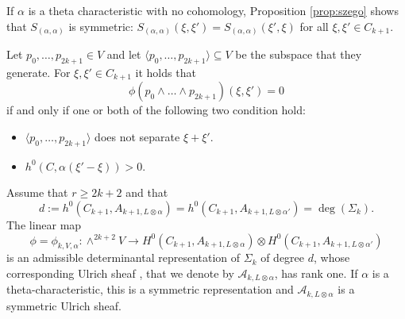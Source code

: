 \documentclass[10pt,a4paper]{amsart}
\newcommand{\sA}{\mathscr{A}}
\begin{document}
\begin{remark}\label{rem:szegosymm}
 If $\alpha$ is a theta characteristic with no cohomology, Proposition \ref{prop:szego} shows that $S_{(\alpha,\alpha)}$ is symmetric: $S_{(\alpha,\alpha)}(\xi,\xi') = S_{(\alpha,\alpha)}(\xi',\xi)$ for all $\xi,\xi'\in C_{k+1}$.
\end{remark}

\begin{lemma}\label{lem:phivanishes}
	Let $p_0,\dots,p_{2k+1} \in V$ and let $\langle p_0,\dots,p_{2k+1} \rangle \subseteq V$ be the subspace that they generate. For $\xi,\xi'\in C_{k+1}$ it holds that
	\[ \phi(p_0\wedge \dots \wedge p_{2k+1})(\xi,\xi') = 0 \]
	if and only if one or both of the following two condition hold:
	\begin{itemize}
		\item[$(a)$]  $\langle p_0,\dots,p_{2k+1} \rangle$ does not separate $\xi+\xi'$.
		\item[$(b)$] $h^0(C,\alpha(\xi'-\xi))>0$.
	\end{itemize}
\end{lemma}

\begin{theorem}\label{thm:detrep}
	Assume that $r\geq 2k+2$ and that \[d:=h^0(C_{k+1},A_{k+1,L\otimes \alpha}) = h^0(C_{k+1},A_{k+1,L\otimes \alpha'}) = \deg(\Sigma_k).\] The linear map
	\[  \phi = \phi_{k,V,\alpha} \colon \wedge^{2k+2} V \longrightarrow H^0(C_{k+1},A_{k+1,L\otimes \alpha}) \otimes H^0(C_{k+1},A_{k+1,L\otimes \alpha'}) \]
	is an admissible determinantal representation of $\Sigma_k$ of degree $d$, whose corresponding Ulrich sheaf , that we denote by $\sA_{k,L\otimes \alpha}$, has rank one. If $\alpha$ is a theta-characteristic, this is a symmetric representation and $\sA_{k,L\otimes \alpha}$ is a symmetric Ulrich sheaf.
\end{theorem}
\end{document}
